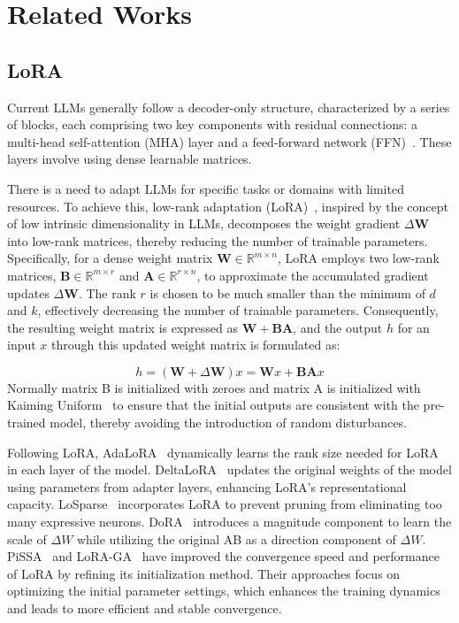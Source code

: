 \section{Related Works}
\subsection{LoRA}
Current LLMs generally follow a decoder-only structure, characterized by a series of blocks, each comprising two key components with residual connections: a multi-head self-attention (MHA) layer and a feed-forward network (FFN)~\cite{vaswani2017attention}. These layers involve using dense learnable matrices. 

There is a need to adapt LLMs for specific tasks or domains with limited resources. To achieve this, low-rank adaptation (LoRA)~\cite{hu2021lora}, inspired by the concept of low intrinsic dimensionality in LLMs, decomposes the weight gradient $\Delta \mathbf{W}$ into low-rank matrices, thereby reducing the number of trainable parameters. Specifically, for a dense weight matrix $\mathbf{W} \in \mathbb{R}^{m \times n}$, LoRA employs two low-rank matrices, $\mathbf{B} \in \mathbb{R}^{m \times r}$ and $\mathbf{A} \in \mathbb{R}^{r \times n}$, to approximate the accumulated gradient updates $\Delta \mathbf{W}$. The rank $r$ is chosen to be much smaller than the minimum of $d$ and $k$, effectively decreasing the number of trainable parameters. Consequently, the resulting weight matrix is expressed as $\mathbf{W} + \mathbf{B}\mathbf{A}$, and the output $h$ for an input $x$ through this updated weight matrix is formulated as:

\begin{equation}
    h = (\mathbf{W} + \Delta \mathbf{W}) x = \mathbf{W} x + \mathbf{B} \mathbf{A} x
    \label{eq:lora_output}
\end{equation}
Normally matrix B is initialized with zeroes and matrix A is initialized with Kaiming Uniform~\cite{he2015delving} to ensure that the initial outputs are consistent with the pre-trained model, thereby avoiding the introduction of random disturbances.

Following LoRA, AdaLoRA~\cite{zhang2023adalora} dynamically learns the rank size needed for LoRA in each layer of the model. DeltaLoRA~\cite{zi2023delta} updates the original weights of the model using parameters from adapter layers, enhancing LoRA’s representational capacity. LoSparse~\cite{li2023losparse} incorporates LoRA to prevent pruning from eliminating too many expressive neurons. DoRA~\cite{liu2024dora} introduces a magnitude component to learn the scale of $\Delta W$ while utilizing the original AB as a direction component of $\Delta W$. PiSSA~\cite{meng2025pissa} and LoRA-GA~\cite{wang2024loragalowrankadaptationgradient} have improved the convergence speed and performance of LoRA by refining its initialization method. Their approaches focus on optimizing the initial parameter settings, which enhances the training dynamics and leads to more efficient and stable convergence. 

